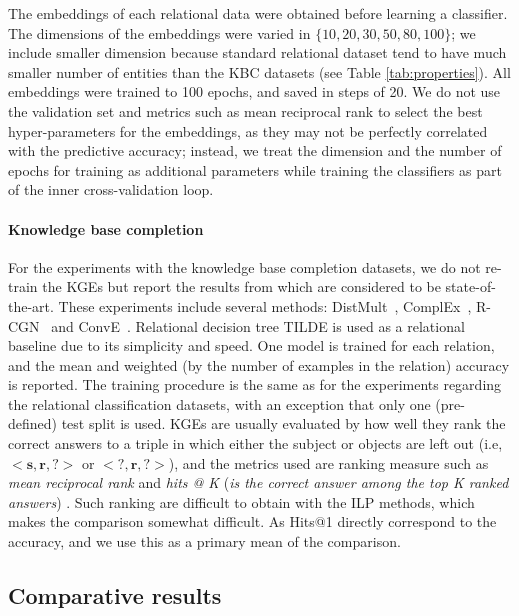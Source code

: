 The embeddings of each relational data were obtained before learning a classifier.
The dimensions of the embeddings were varied in $\{10, 20, 30, 50, 80, 100\}$; we include smaller dimension because standard relational dataset tend to have much smaller number of entities than the KBC datasets (see Table \ref{tab:properties}).
All embeddings were trained to 100 epochs, and saved in steps of 20.
We do not use the validation set and metrics such as mean reciprocal rank to select the best hyper-parameters for the embeddings, as they may not be perfectly correlated with the predictive accuracy; instead, we treat the dimension and the number of epochs for training as additional parameters while training the classifiers as part of the inner cross-validation loop.


\paragraph{Knowledge base completion}
For the experiments with the knowledge base completion datasets, we do not re-train the KGEs but report the results from \cite{dettmers2018conve} which are considered to be state-of-the-art.
These experiments include several methods: DistMult~\cite{YangYHGD14a}, ComplEx~\cite{trouillon2016complex}, R-CGN~\cite{Schlichtkrull2017ModelingRD} and ConvE~\cite{dettmers2018conve}.
Relational decision tree TILDE is used as a relational baseline due to its simplicity and speed.
One model is trained for each relation, and the mean and weighted (by the number of examples in the relation) accuracy is reported.
The training procedure is the same as for the experiments regarding the relational classification datasets, with an exception that only one (pre-defined) test split is used.
KGEs are usually evaluated by how well they rank the correct answers to a triple in which either the subject or objects are left out (i.e, $<\mathbf{s},\mathbf{r},\mathbf{?}>$ or $<\mathbf{?},\mathbf{r},\mathbf{?}>$), and the metrics used are ranking measure such as \textit{mean reciprocal rank} and \textit{hits @ K} (\textit{is the correct answer among the top K ranked answers}) \cite{Bordes:2013:TEM}.
Such ranking are difficult to obtain with the ILP methods, which makes the comparison somewhat difficult.
As Hits@1 directly correspond to the accuracy, and we use this as a primary mean of the comparison.







\subsection{Comparative results}

